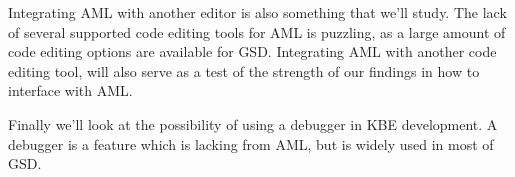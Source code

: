 Integrating AML with another editor is also something that we'll study. The lack of several supported code editing tools for AML is puzzling, as a large amount of code editing options are available for GSD. Integrating AML with another code editing tool, will also serve as a test of the strength of our findings in how to interface with AML.

Finally we'll look at the possibility of using a debugger in KBE development. A debugger is a feature which is lacking from AML, but is widely used in most of GSD.
